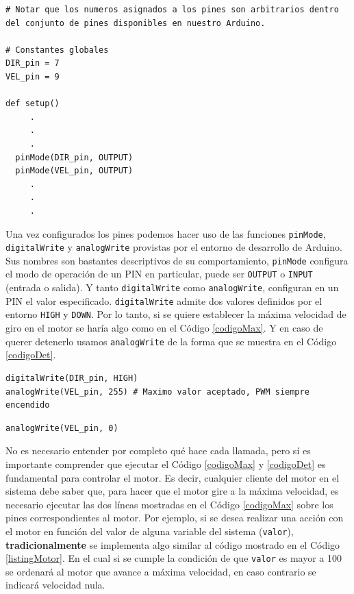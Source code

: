 \begin{lstlisting}[caption=Configuración inicial del control del motor DC.,label={listing1}]
# Notar que los numeros asignados a los pines son arbitrarios dentro del conjunto de pines disponibles en nuestro Arduino.

# Constantes globales
DIR_pin = 7
VEL_pin = 9

def setup()
     .
     .
     .
  pinMode(DIR_pin, OUTPUT)
  pinMode(VEL_pin, OUTPUT)
     .
     .
     .
\end{lstlisting}


Una vez configurados los pines podemos hacer uso de las funciones \verb|pinMode|, \verb|digitalWrite| y \verb|analogWrite| provistas por el entorno de desarrollo de Arduino. Sus nombres son bastantes descriptivos de su comportamiento, \verb|pinMode| configura el modo de operación de un PIN en particular, puede ser \verb|OUTPUT| o \verb|INPUT| (entrada o salida). Y tanto \verb|digitalWrite| como \verb|analogWrite|, configuran en un PIN el valor especificado. \verb|digitalWrite| admite dos valores definidos por el entorno \verb|HIGH| y \verb|DOWN|. Por lo tanto, si se quiere establecer la máxima velocidad de giro en el motor se haría algo como en el Código \ref{codigoMax}. Y en caso de querer detenerlo usamos \verb|analogWrite| de la forma que se muestra en el Código \ref{codigoDet}.

\begin{lstlisting}[caption=Establecer 
máxima velocidad giro en sentido horario.,label={codigoMax}]
digitalWrite(DIR_pin, HIGH)
analogWrite(VEL_pin, 255) # Maximo valor aceptado, PWM siempre encendido
\end{lstlisting}

\begin{lstlisting}[caption=Detener giro del motor DC., label={codigoDet}]
analogWrite(VEL_pin, 0)
\end{lstlisting}

No es necesario entender por completo qué hace cada llamada, pero sí es importante comprender que ejecutar el Código \ref{codigoMax} y \ref{codigoDet} es fundamental para controlar el motor. Es decir, cualquier cliente del motor en el sistema debe saber que, para hacer que el motor gire a la máxima velocidad, es necesario ejecutar las dos líneas mostradas en el Código \ref{codigoMax} sobre los pines correspondientes al motor. Por ejemplo, si se desea realizar una acción con el motor en función del valor de alguna variable del sistema (\verb|valor|), \textbf{tradicionalmente} se implementa algo similar al código mostrado en el Código \ref{listingMotor}. En el cual si se cumple la condición de que \verb|valor| es mayor a 100 se ordenará al motor que avance a máxima velocidad, en caso contrario se indicará velocidad nula.

